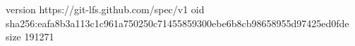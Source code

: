 version https://git-lfs.github.com/spec/v1
oid sha256:eafa8b3a113c1c961a750250c71455859300ebe6b8cb98658955d97425ed0fde
size 191271
